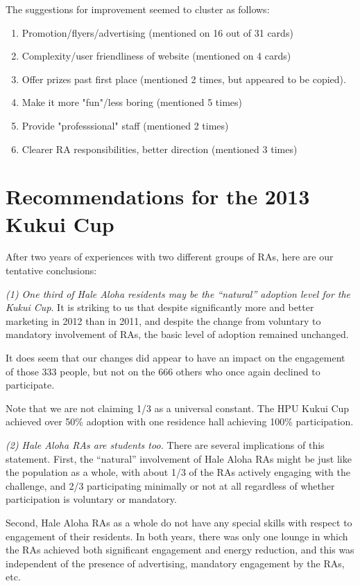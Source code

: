 \documentclass[]{IEEEconf}
\begin{document}
The suggestions for improvement seemed to cluster as follows:

\begin{enumerate}[noitemsep]
\item Promotion/flyers/advertising (mentioned on 16 out of 31 cards)
\item Complexity/user friendliness of website (mentioned on 4 cards)
\item Offer prizes past first place (mentioned 2 times, but appeared to be copied).
\item Make it more "fun"/less boring (mentioned 5 times)
\item Provide "professsional" staff (mentioned 2 times)
\item Clearer RA responsibilities, better direction (mentioned 3 times)
\end{enumerate}


\section{Recommendations for the 2013 Kukui Cup}
\label{kc-2013}

After two years of experiences with two different groups of RAs, here are our tentative
conclusions:

{\em (1) One third of Hale Aloha residents may be the ``natural'' adoption level for
  the Kukui Cup}.  It is striking to us that despite significantly more and better
marketing in 2012 than in 2011, and despite the change from voluntary to mandatory
involvement of RAs, the basic level of adoption remained unchanged.  

It does seem that our changes did appear to have an impact on the engagement of those 333
people, but not on the 666 others who once again declined to participate.

Note that we are not claiming 1/3 as a universal constant.  The HPU Kukui Cup achieved
over 50\% adoption with one residence hall achieving 100\% participation. 

{\em (2) Hale Aloha RAs are students too.}  There are several implications of this statement.  First, the
``natural'' involvement of Hale Aloha RAs might be just like the population as a whole,
with about 1/3 of the RAs actively engaging with the challenge, and 2/3 participating
minimally or not at all regardless of whether participation is voluntary or mandatory.

Second, Hale Aloha RAs as a whole do not have any special skills with respect to
engagement of their residents.  In both years, there was only one lounge in which the RAs
achieved both significant engagement and energy reduction, and this was independent of the
presence of advertising, mandatory engagement by the RAs, etc.
\end{document}
